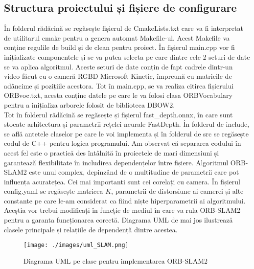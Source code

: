 \documentclass[12pt,a4paper]{report}
\begin{document}
\subsection{Structura proiectului și fișiere de configurare}
În folderul rădăcină se regăsește fișierul de CmakeLists.txt care va fi interpretat de utilitarul
cmake pentru a genera automat Makefile-ul. 
Acest Makefile va conține regulile de build și de clean pentru proiect. În fișierul main.cpp
vor fi inițializate componentele și se va putea selecta pe care dintre cele 2 seturi
de date se va aplica algoritmul. Aceste seturi de date conțin de fapt cadrele dintr-un video 
făcut cu o cameră RGBD Microsoft Kinetic, împreună cu matricile de adâncime și pozițiile acestora.
Tot în main.cpp, se va realiza citirea fișierului ORBvoc.txt, acesta conține datele pe care le va
folosi clasa ORBVocabulary pentru a inițializa arborele folosit de biblioteca DBOW2. \\
Tot în folderul rădăcină se regăsește și fișierul fast\_depth.onnx, în care sunt stocate 
arhitectura și parametrii rețelei neurale FastDepth. În folderul de include, se află antetele claselor
pe care le voi implementa și în folderul de src se regăsește codul de C++ pentru logica programului.
Am observat că separarea codului în acest fel este o practică des întâlnită în proiectele de mari
dimensiuni și garantează flexibilitate în includirea dependențelor între fișiere. Algoritmul 
ORB-SLAM2 este unul complex, depinzând de o multitudine de parametrii care pot influența acuratețea.
Cei mai importanti sunt cei corelați cu camera. În fișierul config.yaml se regăsește matricea \(K\), 
parametrii de distorsiune ai camerei și alte constante pe care le-am considerat ca fiind niște
hiperparametrii ai algoritmului. Aceștia vor trebui modificați în funcție de mediul în care va 
rula ORB-SLAM2 pentru a garanta funcționarea corectă. Diagrama UML de mai jos ilustrează clasele
principale și relațiile de dependență dintre acestea.
\begin{figure}[htbp] 
  \centering
  \texttt{[image: ./images/uml\_SLAM.png]}
  \caption{Diagrama UML pe clase pentru implementarea ORB-SLAM2}\label{fig:diagrama_clase}
\end{figure}
\end{document}
